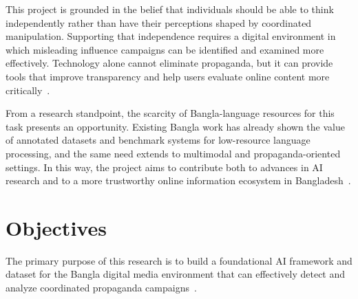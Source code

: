 \documentclass[12pt,a4paper]{report}
\begin{document}
This project is grounded in the belief that individuals should be able to think
independently rather than have their perceptions shaped by coordinated
manipulation. Supporting that independence requires a digital environment in which
misleading influence campaigns can be identified and examined more effectively.
Technology alone cannot eliminate propaganda, but it can provide tools that improve
transparency and help users evaluate online content more critically~\cite{ng2023}.

From a research standpoint, the scarcity of Bangla-language resources for this task
presents an opportunity. Existing Bangla work has already shown the value of
annotated datasets and benchmark systems for low-resource language processing, and
the same need extends to multimodal and propaganda-oriented settings. In this way,
the project aims to contribute both to advances in AI research and to a more
trustworthy online information ecosystem in Bangladesh~\cite{hossain2020}.

\section{Objectives}
The primary purpose of this research is to build a foundational AI framework and
dataset for the Bangla digital media environment that can effectively detect and
analyze coordinated propaganda campaigns~\cite{ng2023}.
\end{document}
